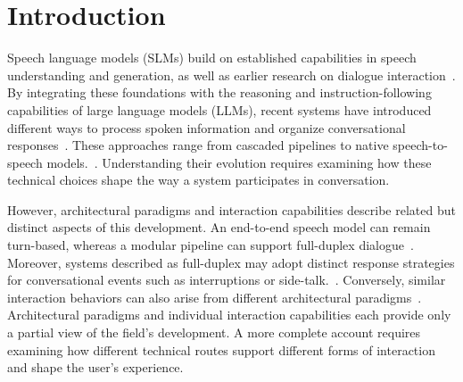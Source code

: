\section{Introduction}
\label{sec:introduction}

Speech language models (SLMs) build on established capabilities in speech understanding and generation, as well as earlier research on dialogue interaction~\cite{DBLP:conf/nips/BaevskiZMA20,DBLP:conf/icml/RadfordKXBMS23,DBLP:conf/naacl/RauxE09,DBLP:conf/icassp/ShenPWSJYCZWRSA18}. By integrating these foundations with the reasoning and instruction-following capabilities of large language models (LLMs), recent systems have introduced different ways to process spoken information and organize conversational responses~\cite{DBLP:conf/emnlp/ZhangLZZWZQ23,DBLP:conf/iclr/TangYSC000M024,DBLP:conf/iclr/FangGZMZ025,DBLP:journals/corr/abs-2604-15804}. These approaches range from cascaded pipelines to native speech-to-speech models.~\cite{DBLP:conf/aaai/HuangLYSCYWHHLR24,DBLP:journals/corr/abs-2604-15804,DBLP:journals/corr/abs-2412-02612,DBLP:journals/corr/abs-2410-00037}. Understanding their evolution requires examining how these technical choices shape the way a system participates in conversation.

However, architectural paradigms and interaction capabilities describe related but distinct aspects of this development. An end-to-end speech model can remain turn-based, whereas a modular pipeline can support full-duplex dialogue~\cite{DBLP:conf/emnlp/ZhangLZZWZQ23,DBLP:journals/corr/abs-2412-02612,DBLP:journals/corr/abs-2502-13472,DBLP:journals/corr/abs-2509-06502}. Moreover, systems described as full-duplex may adopt distinct response strategies for conversational events such as interruptions or side-talk.~\cite{DBLP:journals/corr/abs-2410-00037,DBLP:journals/corr/abs-2501-06282,DBLP:conf/icml/WangLFZS000M25,DBLP:conf/acl/ZhangCDCWZLYTDZ25}. Conversely, similar interaction behaviors can also arise from different architectural paradigms~\cite{DBLP:journals/corr/abs-2502-13472,DBLP:journals/corr/abs-2501-06282,DBLP:conf/icml/WangLFZS000M25,DBLP:conf/acl/ZhangCDCWZLYTDZ25}. Architectural paradigms and individual interaction capabilities each provide only a partial view of the field’s development. A more complete account requires examining how different technical routes support different forms of interaction and shape the user’s experience.



